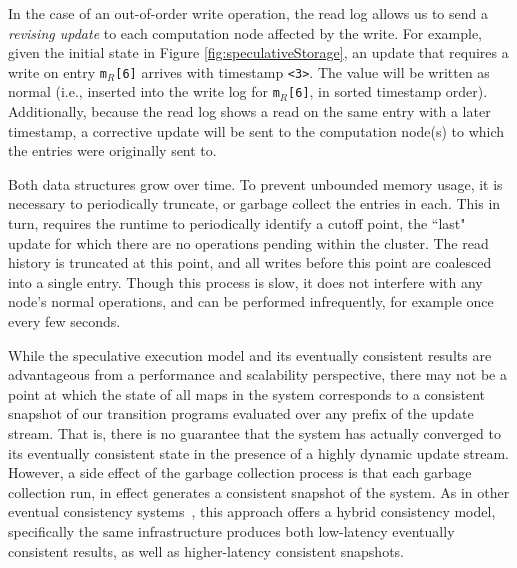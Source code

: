 In the case of an out-of-order write operation, the read log allows us to send a
\textit{revising update} to each computation node affected by the write.
For example, given the initial state in Figure \ref{fig:speculativeStorage}, an
update that requires a write on entry \texttt{m$_R$[6]} arrives with timestamp
\texttt{<3>}.  The value will be written as normal (i.e., inserted into the
write log for \texttt{m$_R$[6]}, in sorted timestamp order).  Additionally,
because the read log shows a read on the same entry with a later timestamp, a
corrective update will be sent to the computation node(s) to which the entries
were originally sent to.

Both data structures grow over time.  To prevent unbounded memory usage,
it is necessary to periodically truncate, or garbage collect the entries in each. 
This in turn, requires the runtime to periodically identify a cutoff point, the
``last" update for which there are no operations pending within the cluster. 
The read history is truncated at this point, and all writes before this point
are coalesced into a single entry.  Though this process is slow, it does not
interfere with any node's normal operations, and can be performed
infrequently, for example once every few seconds.

While the speculative execution model and its eventually consistent results are
advantageous from a performance and scalability perspective, there may not be a
point at which the state of all maps in the system corresponds to a consistent
snapshot of our transition programs evaluated over any prefix of the update
stream.
That is, there is no guarantee that the system has actually converged to its
eventually consistent state in the presence of a highly dynamic update stream.
However, a side effect of the garbage collection process is that each garbage
collection run, in effect generates a consistent snapshot of the system. As in
other eventual consistency systems~\cite{bayou}, this approach offers a hybrid
consistency model, specifically the same infrastructure produces both
low-latency eventually consistent results, as well as higher-latency consistent
snapshots.

